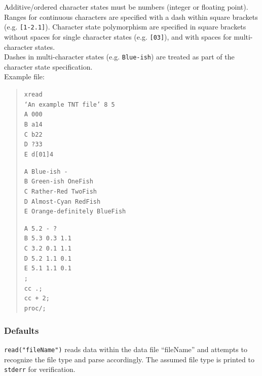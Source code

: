\begin{description}
		 Additive/ordered character states must be numbers (integer or floating point). Ranges 
		 for continuous characters are specified with a dash within square brackets (e.g. 
		 \texttt{[1-2.1]}). Character state polymorphism are specified in square brackets without 
		 spaces for single character states (e.g. \texttt{[03]}), and with spaces for multi-character 
		 states.\\
		  
		 Dashes in multi-character states (e.g. \texttt{Blue-ish}) are treated as part of the character 
		 state specification.
		 \\
		  
		  Example file:
		  	\begin{quote}
			  	\texttt{xread\\
				  	`An example TNT file' 8 5\\
				  	A 000\\
				  	B a14\\
				  	C b22\\
				  	D ?33\\
				  	E d[01]4\\}
			  	
			  	\texttt{A Blue-ish -\\
				  	B Green-ish OneFish\\
				  	C Rather-Red TwoFish\\
				  	D Almost-Cyan RedFish\\
				  	E Orange-definitely BlueFish\\}
					
				\texttt{A 5.2 - ?\\
					 B 5.3 0.3 1.1\\
					 C 3.2 0.1 1.1\\
					 D 5.2 1.1 0.1\\
					 E 5.1 1.1 0.1\\
				  	;\\
				  	cc .;\\
				  	cc + 2;\\
				  	proc/;\\}
			  \end{quote}
			  
	\end{description}	
		
	\subsubsection{Defaults}
		\texttt{read("fileName")} reads data within the data file ``fileName'' and attempts to 
		recognize the file type and parse accordingly. The assumed file type is printed to 
		\texttt{stderr} for verification.
		
